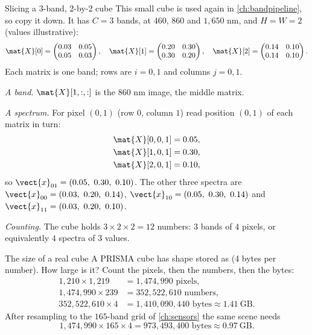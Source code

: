 
\begin{worked}[label={we:light:cube}]{Slicing a 3-band, 2-by-2 cube}
This small cube is used again in \cref{ch:bandpipeline}, so copy it down. It has $C=3$ bands, at
$460$, $860$ and $1{,}650$ nm, and $H = W = 2$ (values illustrative\tagA):
\[
\mat{X}[0] = \begin{pmatrix} 0.03 & 0.05 \\ 0.05 & 0.03 \end{pmatrix},\quad
\mat{X}[1] = \begin{pmatrix} 0.20 & 0.30 \\ 0.30 & 0.20 \end{pmatrix},\quad
\mat{X}[2] = \begin{pmatrix} 0.14 & 0.10 \\ 0.14 & 0.10 \end{pmatrix}.
\]
Each matrix is one band; rows are $i = 0, 1$ and columns $j = 0, 1$.

\emph{A band.} $\mat{X}[1, :, :]$ is the $860$ nm image, the middle matrix.

\emph{A spectrum.} For pixel $(0,1)$ (row $0$, column $1$) read position $(0,1)$ of each
matrix in turn:
\begin{align*}
\mat{X}[0,0,1] &= 0.05,\\
\mat{X}[1,0,1] &= 0.30,\\
\mat{X}[2,0,1] &= 0.10,
\end{align*}
so $\vect{x}_{01} = (0.05,\ 0.30,\ 0.10)$. The other three spectra are
$\vect{x}_{00} = (0.03,\ 0.20,\ 0.14)$, $\vect{x}_{10} = (0.05,\ 0.30,\ 0.14)$ and
$\vect{x}_{11} = (0.03,\ 0.20,\ 0.10)$.

\emph{Counting.} The cube holds $3 \times 2 \times 2 = 12$ numbers: $3$ bands of $4$ pixels, or
equivalently $4$ spectra of $3$ values.
\end{worked}

\begin{worked}[label={we:light:bytes}]{The size of a real cube}
A PRISMA cube has shape  stored as  (4 bytes per
number). How large is it? Count the pixels, then the numbers, then the bytes:
\begin{align*}
1{,}210 \times 1{,}219 &= 1{,}474{,}990 \text{ pixels},\\
1{,}474{,}990 \times 239 &= 352{,}522{,}610 \text{ numbers},\\
352{,}522{,}610 \times 4 &= 1{,}410{,}090{,}440 \text{ bytes} \approx 1.41\ \text{GB}.
\end{align*}
After resampling to the $165$-band grid of \cref{ch:sensors} the same scene needs
\[ 1{,}474{,}990 \times 165 \times 4 = 973{,}493{,}400 \text{ bytes} \approx 0.97\ \text{GB}. \]
\end{worked}

